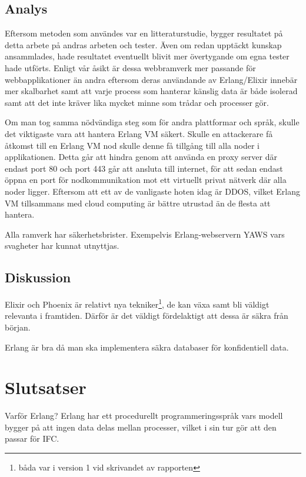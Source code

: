 \documentclass[12pt]{article}
\begin{document}
\subsection{Analys}
Eftersom metoden som användes var en litteraturstudie, bygger resultatet på detta arbete på andras arbeten och tester. Även om redan upptäckt kunskap ansammlades, hade resultatet eventuellt blivit mer övertygande om egna tester  hade utförts.
Enligt vår åsikt är dessa webbramverk mer passande för webbapplikationer än andra eftersom deras användande av Erlang/Elixir innebär mer skalbarhet samt att varje process som hanterar känslig data är både isolerad samt att det inte kräver lika mycket minne som trådar och processer gör.

Om man tog samma nödvändiga steg som för andra plattformar och språk, skulle det viktigaste vara att hantera Erlang VM säkert. Skulle en attackerare få åtkomst till en Erlang VM nod skulle denne få tillgång till alla noder i applikationen.
Detta går att hindra genom att använda en proxy \cite{101} server där endast port 80 och port 443 går att ansluta till internet, för att sedan endast öppna en port för nodkommunikation mot ett virtuellt privat nätverk där alla noder ligger.
 Eftersom att ett av de vanligaste hoten idag är DDOS, vilket Erlang VM tillsammans med cloud computing är bättre utrustad än de flesta att hantera.

Alla ramverk har säkerhetsbrister. Exempelvis Erlang-webservern YAWS vars svagheter har kunnat utnyttjas. \cite{exploit} 
	\subsection{Diskussion}

Elixir och Phoenix är relativt nya tekniker\footnote{båda var i version 1 vid skrivandet av rapporten}, de kan växa samt bli väldigt relevanta i framtiden\cite{phoenix/ruby}. Därför är det väldigt fördelaktigt att dessa är säkra från början.

Erlang är bra då man ska implementera säkra databaser för konfidentiell data.
 \cite{database}
    
    
\section{Slutsatser}


Varför Erlang? Erlang har ett procedurellt programmeringsspråk vars modell bygger på att ingen data delas mellan processer, vilket i sin tur gör att den passar för IFC.
\end{document}
